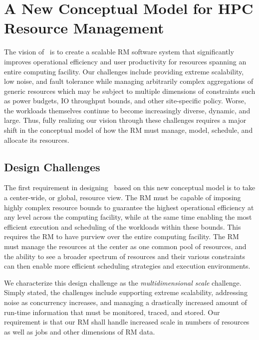 \section{A New Conceptual Model for HPC Resource Management}
The vision of \flux\ is to create a scalable RM
software system that significantly improves
operational efficiency and user productivity
for resources spanning an entire
computing facility.
Our challenges include providing extreme
scalability, low noise, and fault tolerance while
managing arbitrarily complex aggregations of generic resources
which may be subject to multiple dimensions of constraints
such as power budgets, IO throughput bounds, and other site-specific
policy.
Worse, the workloads themselves continue to become
increasingly diverse, dynamic, and large.
Thus, fully realizing our vision through
these challenges requires a major shift
in the conceptual model of how the RM must manage, model, schedule,
and allocate its resources.

\subsection{Design Challenges}
\label{sect:challenges}

The first requirement in designing \flux\ based on this
new conceptual model is to take a center-wide, or global,
resource view.  The RM must be capable of
imposing highly complex resource bounds
to guarantee the highest operational efficiency
at any level across the computing facility, 
while at the same time enabling the most efficient
execution and scheduling of the workloads
within these bounds.
This requires the RM to have purview over 
the entire computing facility. 
The RM must manage the resources at the center
as one common pool of resources, and the ability
to see a broader spectrum of resources
and their various constraints can then enable
more efficient scheduling strategies
and execution environments. 

We characterize this design challenge as the {\em multidimensional
scale} challenge.  Simply stated, the challenges include
supporting extreme scalability, addressing noise as concurrency
increases, and managing a drastically increased amount of
run-time information that must be monitored, traced, and stored.
Our requirement is that our RM shall handle increased scale in
numbers of resources as well as jobs and other dimensions of RM data.

